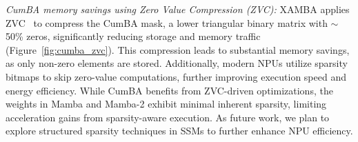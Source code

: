 \textit{CumBA memory savings using Zero Value Compression (ZVC):}
XAMBA applies ZVC~\cite{zvc} to compress the CumBA mask, a lower triangular binary matrix with $\sim$50\% zeros, significantly reducing storage and memory traffic (Figure~\ref{fig:cumba_zvc}). This compression leads to substantial memory savings, as only non-zero elements are stored. Additionally, modern NPUs utilize sparsity bitmaps to skip zero-value computations, further improving execution speed and energy efficiency. While CumBA benefits from ZVC-driven optimizations, the weights in Mamba and Mamba-2 exhibit minimal inherent sparsity, limiting acceleration gains from sparsity-aware execution. As future work, we plan to explore structured sparsity techniques in SSMs to further enhance NPU efficiency.

